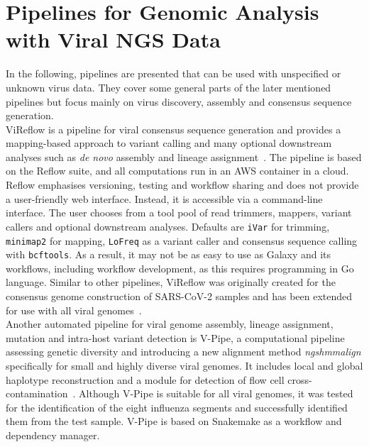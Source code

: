 \section{Pipelines for Genomic Analysis with Viral NGS Data}\label{sec:2-general-pipelines}
In the following, pipelines are presented that can be used with unspecified or unknown virus data. They cover some general parts of the later mentioned pipelines but focus mainly on virus discovery, assembly and consensus sequence generation. \\
ViReflow is a pipeline for viral consensus sequence generation and provides a mapping-based approach to variant calling and many optional downstream analyses such as \textit{de novo} assembly and lineage assignment~\cite{moshiri2022vireflow}. The pipeline is based on the Reflow suite, and all computations run in an \ac{AWS} container in a cloud. Reflow emphasises versioning, testing and workflow sharing and does not provide a user-friendly web interface. Instead, it is accessible via a command-line interface. The user chooses from a tool pool of read trimmers, mappers, variant callers and optional downstream analyses. Defaults are \texttt{iVar} for trimming, \texttt{minimap2} for mapping, \texttt{LoFreq} as a variant caller and consensus sequence calling with \texttt{bcftools}. As a result, it may not be as easy to use as Galaxy and its workflows, including workflow development, as this requires programming in Go language. Similar to other pipelines, ViReflow was originally created for the consensus genome construction of \ac{SARS-CoV-2} samples and has been extended for use with all viral genomes~\cite{moshiri2022vireflow}. \\
Another automated pipeline for viral genome assembly, lineage assignment, mutation and intra-host variant detection is V-Pipe, a computational pipeline assessing genetic diversity and introducing a new alignment method \textit{ngshmmalign} specifically for small and highly diverse viral genomes. It includes local and global haplotype reconstruction and a module for detection of flow cell cross-contamination~\cite{posada2021v}. Although V-Pipe is suitable for all viral genomes, it was tested for the identification of the eight influenza segments and successfully identified them from the test sample. V-Pipe is based on Snakemake as a workflow and dependency manager. \\
